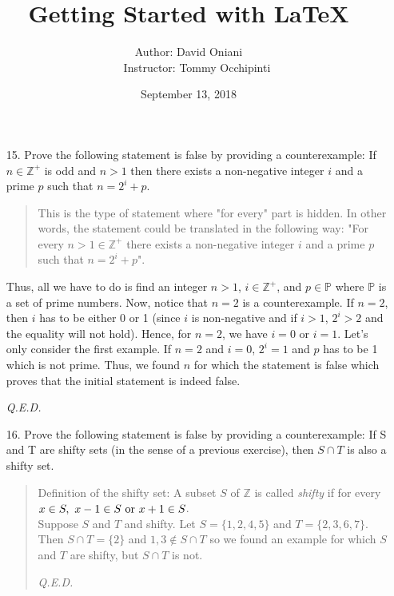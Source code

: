\documentclass[12pt, a4paper]{article}             %
\title{\bf{Getting Started with \LaTeX}}
\author{Author: David Oniani
\\
\ \ \ Instructor: Tommy Occhipinti}
\date{September 13, 2018}
\begin{document}
\maketitle


\begin{enumerate}
\item[15.]
Prove the following statement is false by providing a counterexample: If $n \in \mathbb{Z}^+$ is odd
and $n > 1$ then there exists a non-negative integer $i$ and a prime $p$ such that $n = 2^i + p$.
\\

\begin{quote}
This is the type of statement where "for every" part is hidden. In other words,
the statement could be translated in the following way: "For every $n > 1 \in \mathbb{Z}^+$
there exists a non-negative integer $i$ and a prime $p$ such that
$n = 2^i + p$".
\end{quote}

Thus, all we have to do is find an integer $n > 1$, $i \in \mathbb{Z}^+$, and $p \in \mathbb{P}$ where $\mathbb{P}$ is a set
of prime numbers. Now, notice that $n = 2$ is a counterexample. If $n = 2$, then $i$ has to be either 0 or 1 (since $i$ is non-negative and
if $i > 1$, $2^i > 2$ and the equality will not hold).
Hence, for $n = 2$, we have $i = 0$ or $i = 1$. Let's only consider the first example.
If $n = 2$ and $i = 0$, $2^i = 1$ and $p$ has to be 1 which is not prime. Thus, we found $n$ for which the statement is false which
proves that the initial statement is indeed false.
\begin{flushright}
\textit{Q.E.D.}
\end{flushright}

\item[16.]
Prove the following statement is false by providing a counterexample:
If S and T are shifty sets (in the sense of a previous exercise), then $S \cap T$ is also a shifty set.
\begin{quote}
Definition of the shifty set: A subset $S$ of $\mathbb{Z}$ is called \textit{shifty} if for every $x \in S, \ x-1 \in S \ \textnormal{or} \ x + 1 \in S$.\\

Suppose $S$ and $T$ and shifty. Let $S = \{1,2,4,5\}$ and $T = \{2,3,6,7\}$.
Then $S \cap T = \{2\}$ and $1, 3 \notin S \cap T$ so we found an example for which
$S$ and $T$ are shifty, but $S \cap T$ is not.
\begin{flushright}
\textit{Q.E.D.}
\end{flushright}
\end{quote}


\end{enumerate}
\end{document}
